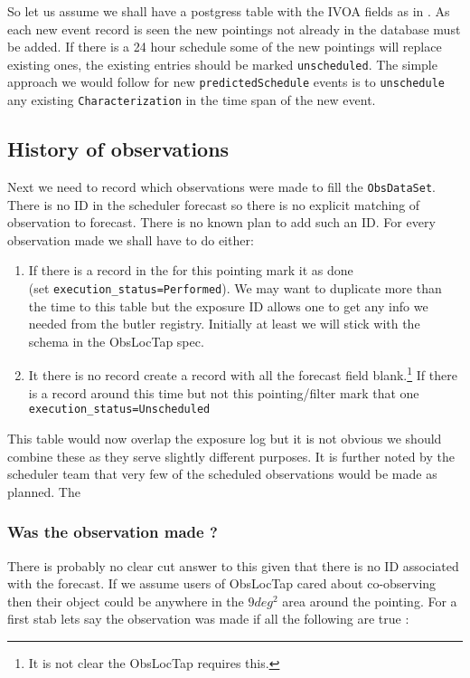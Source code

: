 


So let us assume we shall have a postgress table with the IVOA fields as in .
As each new event record is seen the new pointings not already in the database must be added.
If there is a 24 hour schedule some of the new pointings will replace existing ones, the existing entries should be marked \texttt{unscheduled}.
The simple approach we would follow  for new \texttt{predictedSchedule} events is to \texttt {unschedule} any existing \texttt {Characterization} in the time span of the new event.

\subsection{History of observations}
Next we need to record which observations were made to fill the \texttt{ObsDataSet}.
There is no ID in the scheduler forecast so there is no explicit matching of observation to forecast.
There is no known plan to add such an ID.
For every observation made we shall have to do either:
\begin{enumerate}
\item If there is a record in the \DB for this pointing mark it as done\\ (set \texttt{execution\_status=Performed}).  We may want to duplicate more than the time to this table but the exposure ID allows one to get any info we needed from the butler registry.
Initially at least we will stick with the schema in the ObsLocTap spec.
\item It there is no record create a record with  all the forecast field blank.\footnote{It is not clear the ObsLocTap requires this.} If there is a record around this time but not this pointing/filter mark that one  \texttt{execution\_status=Unscheduled}
\end{enumerate}

This table would now overlap the exposure log but it is not obvious we should combine these as they serve slightly different purposes.
It is further noted by the scheduler team that very few of the scheduled observations would be made as planned. The

\subsubsection{Was the  observation made ?}\label{sec:made}
There is probably no clear cut answer to this given that there is no ID associated with the forecast.
If we assume users of ObsLocTap cared about co-observing then their object could be anywhere in the
$9 deg^2$ area around the pointing.
For a first stab lets say the observation was made if all the following are true :

